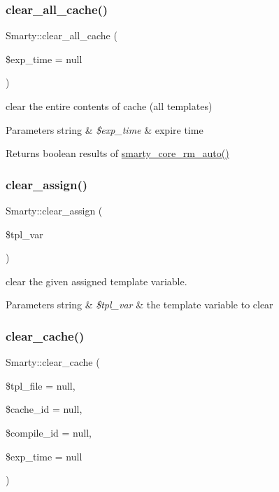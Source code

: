 \subsubsection{\texorpdfstring{clear\+\_\+all\+\_\+cache()}{clear\_all\_cache()}}
{\footnotesize\ttfamily Smarty\+::clear\+\_\+all\+\_\+cache (\begin{DoxyParamCaption}\item[{}]{\$exp\+\_\+time = {\ttfamily null} }\end{DoxyParamCaption})}

clear the entire contents of cache (all templates)


\begin{DoxyParams}[1]{Parameters}
string & {\em \$exp\+\_\+time} & expire time \\
\hline
\end{DoxyParams}
\begin{DoxyReturn}{Returns}
boolean results of \mbox{\hyperlink{}{smarty\+\_\+core\+\_\+rm\+\_\+auto()}} 
\end{DoxyReturn}
\mbox{\label{class_smarty_aaf28142ba020c1d0b84987280594bce7}} 
\subsubsection{\texorpdfstring{clear\+\_\+assign()}{clear\_assign()}}
{\footnotesize\ttfamily Smarty\+::clear\+\_\+assign (\begin{DoxyParamCaption}\item[{}]{\$tpl\+\_\+var }\end{DoxyParamCaption})}

clear the given assigned template variable.


\begin{DoxyParams}[1]{Parameters}
string & {\em \$tpl\+\_\+var} & the template variable to clear \\
\hline
\end{DoxyParams}
\mbox{\label{class_smarty_a612d4aff6b1a9724d7ded0b6cba53166}} 
\subsubsection{\texorpdfstring{clear\+\_\+cache()}{clear\_cache()}}
{\footnotesize\ttfamily Smarty\+::clear\+\_\+cache (\begin{DoxyParamCaption}\item[{}]{\$tpl\+\_\+file = {\ttfamily null},  }\item[{}]{\$cache\+\_\+id = {\ttfamily null},  }\item[{}]{\$compile\+\_\+id = {\ttfamily null},  }\item[{}]{\$exp\+\_\+time = {\ttfamily null} }\end{DoxyParamCaption})}

